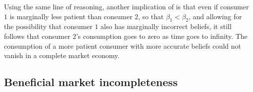 Using  the same line of reasoning, another implication of 
is that even if consumer $1$ is marginally less patient than consumer $2$, so that 
$\beta_1 < \beta_2$, and allowing for the possibility that
consumer $1$ also has marginally incorrect beliefs, it still follows
that consumer $2$'s consumption goes to zero as time goes
to infinity. The consumption of a more patient consumer with more accurate
beliefs could not vanish
 in a complete market economy.





\subsection{Beneficial market incompleteness}

